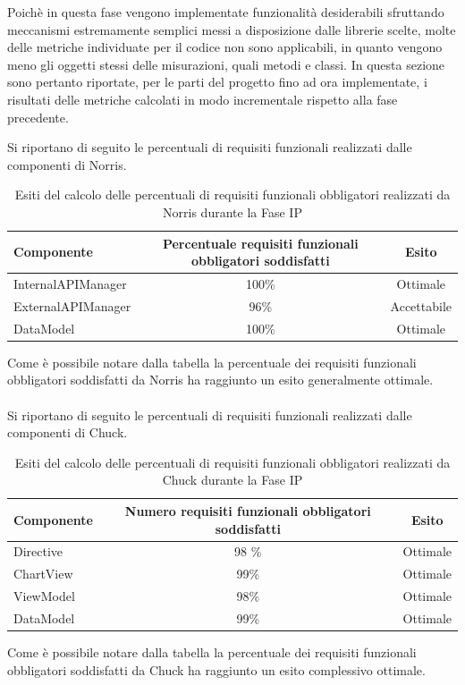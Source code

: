 	Poichè in questa fase vengono implementate funzionalità desiderabili sfruttando meccanismi estremamente semplici messi a disposizione dalle librerie scelte, molte delle metriche individuate per il codice non sono applicabili, in quanto vengono meno gli oggetti stessi delle misurazioni, quali metodi e classi.
	In questa sezione sono pertanto riportate, per le parti del progetto fino ad ora implementate, i risultati delle metriche calcolati in modo incrementale rispetto alla fase precedente.\\


Si riportano di seguito le percentuali di requisiti funzionali realizzati dalle componenti di Norris.
\begin{table}[H]
	\centering
		\begin{tabu}{| l | c | c |}
			\hline
			Componente	& Percentuale requisiti funzionali obbligatori soddisfatti	& Esito		\\ \hline \hline
			InternalAPIManager	& 100\% 	& Ottimale  \\ \hline
			ExternalAPIManager  & 	96\%	& Accettabile  \\ \hline
			DataModel  & 	100\%	& Ottimale  \\ \hline
		\end{tabu}
	\caption{Esiti del calcolo delle percentuali di requisiti funzionali obbligatori realizzati da Norris durante la Fase IP}
\end{table}
Come è possibile notare dalla tabella la percentuale dei requisiti funzionali obbligatori soddisfatti da Norris ha raggiunto un esito generalmente ottimale. 
\\ \\
Si riportano di seguito le percentuali di requisiti funzionali realizzati dalle componenti di Chuck.
\begin{table}[H]
	\centering
		\begin{tabu}{| l | c | c |}
			\hline
			Componente	& Numero requisiti funzionali obbligatori soddisfatti	& Esito		\\ \hline \hline
			Directive	& 98 \% 	& Ottimale  \\ \hline
			ChartView  & 	99\%	& Ottimale  \\ \hline
			ViewModel  & 	98\%	& Ottimale  \\ \hline
			DataModel  & 	99\%	& Ottimale  \\ \hline
		\end{tabu}
	\caption{Esiti del calcolo delle percentuali di requisiti funzionali obbligatori realizzati da Chuck durante la Fase IP}
\end{table}
Come è possibile notare dalla tabella la percentuale dei requisiti funzionali obbligatori soddisfatti da Chuck ha raggiunto un esito complessivo ottimale.

